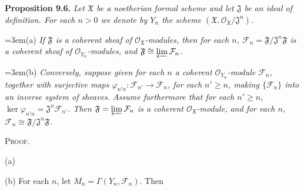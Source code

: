 {\medskip
\noindent\hypertarget{result-II-9.6}{}\textbf{Proposition 9.6.} \emph{Let $\mathfrak X$ be a noetherian formal scheme and let $\mathfrak J$ be an ideal of definition. For each $n>0$ we denote by $Y_n$ the scheme $(\mathfrak X,\mathcal O_{\mathfrak X}/\mathfrak J^n)$.}

\noindent\hangindent=3em\hspace*{1.7em}\hypertarget{result-II-9.6-a}{}(a) \emph{If $\mathfrak F$ is a coherent sheaf of $\mathcal O_{\mathfrak X}$-modules, then for each $n$, $\mathcal F_n=\mathfrak F/\mathfrak J^n\mathfrak F$ is a coherent sheaf of $\mathcal O_{Y_n}$-modules, and $\mathfrak F\cong\varprojlim\mathcal F_n$.}

\noindent\hangindent=3em\hspace*{1.7em}\hypertarget{result-II-9.6-b}{}(b) \emph{Conversely, suppose given for each $n$ a coherent $\mathcal O_{Y_n}$-module $\mathcal F_n$, together with surjective maps $\varphi_{n'n}\colon\mathcal F_{n'}\to\mathcal F_n$, for each $n'\ge n$, making $\{\mathcal F_n\}$ into an inverse system of sheaves. Assume furthermore that for each $n'\ge n$, $\ker\varphi_{n'n}=\mathfrak J^n\mathcal F_{n'}$. Then $\mathfrak F=\varprojlim\mathcal F_n$ is a coherent $\mathcal O_{\mathfrak X}$-module, and for each $n$, $\mathcal F_n\cong\mathfrak F/\mathfrak J^n\mathfrak F$.}

\smallskip
\noindent\textsc{Proof.}

\EditionText{}
(a) 

(b) For each $n$, let $M_n=\Gamma(Y_n,\mathcal F_n)$. Then}
